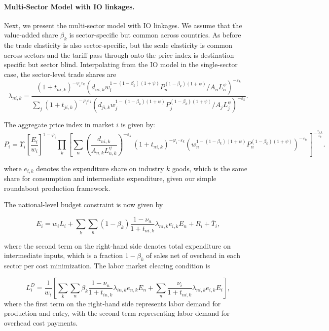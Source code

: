 \documentclass[12pt]{article}
\begin{document}
 \paragraph{Multi-Sector Model with IO linkages.}
Next, we present the multi-sector model with IO linkages. We assume that the value-added share $\beta_k$ is sector-specific but common across countries. As before the trade elasticity is also sector-specific, but the scale elasticity is common across sectors and the tariff pass-through onto the price index is destination-specific but sector blind.  Interpolating from the IO model in the single-sector case, the sector-level trade shares are
 \[
\lambda_{ni,k}=\frac{(1+t_{ni,k})^{-\varphi_{i}\varepsilon_{k}}\left(d_{ni,k}w_{i}^{1-(1-\beta_{k})(1+\psi)}P_{n}^{(1-\beta_{k})(1+\psi)}/A_{n}L_{n}^{\psi}\right)^{-\varepsilon_{k}}}{\sum_{j}(1+t_{ji,k})^{-\varphi_{i}\varepsilon_{k}}\left(d_{ji,k}w_{j}^{1-(1-\beta_{k})(1+\psi)}P_{j}^{(1-\beta_{k})(1+\psi)}/A_{j}L_{j}^{\psi}\right)^{-\varepsilon_{k}}}.
\]

The aggregate price index in market $i$  is given by:
\[
P_{i}=\Upsilon_{i}\left[\frac{E_{i}}{w_{i}}\right]^{1-\varphi_{i}}\prod_{k}\left[\sum_{n}\left(\frac{d_{ni,k}}{A_{n,k}L_{n,k}^{\psi}}\right)^{-\varepsilon_{k}}\,(1+t_{ni,k})^{-\varphi_{i}\cdot\varepsilon_{k}}\left(w_{n}^{1-(1-\beta_{k})(1+\psi)}P_{n}^{(1-\beta_{k})(1+\psi)}\right)^{-\varepsilon_{k}}\,\right]^{-\frac{e_{i,k}}{\varepsilon_{k}}}.
\]

where $e_{i,k}$ denotes the expenditure share on industry $k$ goods, which is the same share for consumption and intermediate expenditure, given our simple roundabout production framework. 

The national-level budget constraint is now given by

\[
E_{i}=w_{i}L_{i}+\sum_{k}\sum_{n}\left(1-\beta_{k}\right)\frac{1-\nu_{n}}{1+t_{ni,k}}\lambda_{ni,k}e_{i,k}E_{n}+R_{i}+ \bar{T}_{i},
\]

where the second term on the right-hand side denotes total expenditure
on intermediate inputs, which is a fraction $1-\beta_k$
of sales net of overhead in each sector per cost minimization. The labor market
clearing condition is

\[
L_{i}^{D}=\frac{1}{w_{i}}\left[\sum_{k}\sum_{n}\beta_{k}\frac{1-\nu_{n}}{1+t_{in,k}}\lambda_{in,k}e_{n,k}E_{n}+\sum_{n}\frac{\nu_{i}}{1+t_{ni,k}}\lambda_{ni,k}e_{i,k}E_{i}\right],
\]
where the first term on the right-hand side represents labor demand
for production and entry, with the second term representing labor
demand for overhead cost payments.
\end{document}
